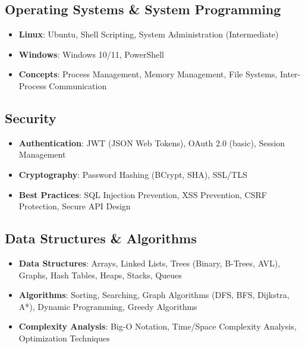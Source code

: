 \documentclass[a4paper,12pt]{article}
\begin{document}
\subsection*{Operating Systems \& System Programming}
\begin{itemize}[nosep,after=\strut, leftmargin=1em, itemsep=1pt]
\item \textbf{Linux}: Ubuntu, Shell Scripting, System Administration (Intermediate)
\item \textbf{Windows}: Windows 10/11, PowerShell
\item \textbf{Concepts}: Process Management, Memory Management, File Systems, Inter-Process Communication
\end{itemize}

\subsection*{Security}
\begin{itemize}[nosep,after=\strut, leftmargin=1em, itemsep=1pt]
\item \textbf{Authentication}: JWT (JSON Web Tokens), OAuth 2.0 (basic), Session Management
\item \textbf{Cryptography}: Password Hashing (BCrypt, SHA), SSL/TLS
\item \textbf{Best Practices}: SQL Injection Prevention, XSS Prevention, CSRF Protection, Secure API Design
\end{itemize}

\subsection*{Data Structures \& Algorithms}
\begin{itemize}[nosep,after=\strut, leftmargin=1em, itemsep=1pt]
\item \textbf{Data Structures}: Arrays, Linked Lists, Trees (Binary, B-Trees, AVL), Graphs, Hash Tables, Heaps, Stacks, Queues
\item \textbf{Algorithms}: Sorting, Searching, Graph Algorithms (DFS, BFS, Dijkstra, A*), Dynamic Programming, Greedy Algorithms
\item \textbf{Complexity Analysis}: Big-O Notation, Time/Space Complexity Analysis, Optimization Techniques
\end{itemize}

\end{document}
